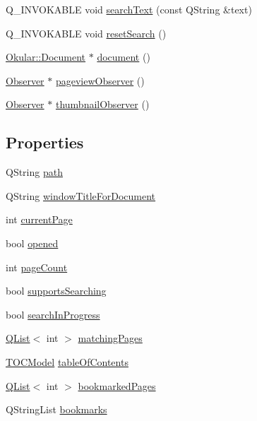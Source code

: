 \begin{DoxyCompactItemize}
\item 
Q\+\_\+\+I\+N\+V\+O\+K\+A\+B\+L\+E void \hyperlink{classDocumentItem_a419b4a129d599d58bcc8313764da60bb}{search\+Text} (const Q\+String \&text)
\item 
Q\+\_\+\+I\+N\+V\+O\+K\+A\+B\+L\+E void \hyperlink{classDocumentItem_a13948b8a6e6ce091fdcdc18a0eaf8a3b}{reset\+Search} ()
\item 
\hyperlink{classOkular_1_1Document}{Okular\+::\+Document} $\ast$ \hyperlink{classDocumentItem_a0b5e08614c27e8b6283a6e26146ce7ce}{document} ()
\item 
\hyperlink{classObserver}{Observer} $\ast$ \hyperlink{classDocumentItem_aa43f574c0d96722c93c2484dc5e1deae}{pageview\+Observer} ()
\item 
\hyperlink{classObserver}{Observer} $\ast$ \hyperlink{classDocumentItem_a301cec0218500b5edffdf863d55de3c1}{thumbnail\+Observer} ()
\end{DoxyCompactItemize}
\subsection*{Properties}
\begin{DoxyCompactItemize}
\item 
Q\+String \hyperlink{classDocumentItem_a30563830d010ecd2bcff1fe87d3f22b5}{path}
\item 
Q\+String \hyperlink{classDocumentItem_ad992855c3e20bfc6b4b62adc2f96061c}{window\+Title\+For\+Document}
\item 
int \hyperlink{classDocumentItem_aaf0a1ffedca483ef328739112fb2793b}{current\+Page}
\item 
bool \hyperlink{classDocumentItem_acc602f4248c496e5bcef51c9f98b1663}{opened}
\item 
int \hyperlink{classDocumentItem_a2604989a9553d297a141f14d2b00e142}{page\+Count}
\item 
bool \hyperlink{classDocumentItem_a0bff2b3923d9140ca120dabbf527b4fa}{supports\+Searching}
\item 
bool \hyperlink{classDocumentItem_a45a70095fcc040a324f5f2f2cc550282}{search\+In\+Progress}
\item 
\hyperlink{classQList}{Q\+List}$<$ int $>$ \hyperlink{classDocumentItem_ad4148c970f6cd31b9b26115e3d7a1753}{matching\+Pages}
\item 
\hyperlink{classTOCModel}{T\+O\+C\+Model} \hyperlink{classDocumentItem_a9291b1c2f73d783093898bdeb6562842}{table\+Of\+Contents}
\item 
\hyperlink{classQList}{Q\+List}$<$ int $>$ \hyperlink{classDocumentItem_aaf15a9cbebd00b8a3d51bcc967dbc105}{bookmarked\+Pages}
\item 
Q\+String\+List \hyperlink{classDocumentItem_a08ec9ecae239f79e0e806efa28cc22b0}{bookmarks}
\end{DoxyCompactItemize}


